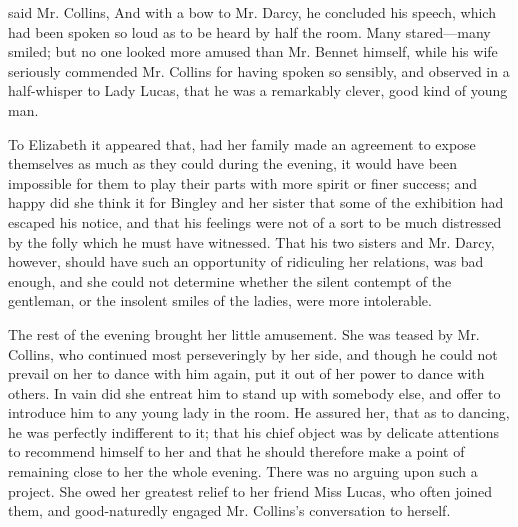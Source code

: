  said Mr. Collins,  And with a bow to Mr. Darcy, he concluded his speech, which had been spoken so loud as to be heard by half the room. Many stared---many smiled; but no one looked more amused than Mr. Bennet himself, while his wife seriously commended Mr. Collins for having spoken so sensibly, and observed in a half-whisper to Lady Lucas, that he was a remarkably clever, good kind of young man.

To Elizabeth it appeared that, had her family made an agreement to expose themselves as much as they could during the evening, it would have been impossible for them to play their parts with more spirit or finer success; and happy did she think it for Bingley and her sister that some of the exhibition had escaped his notice, and that his feelings were not of a sort to be much distressed by the folly which he must have witnessed. That his two sisters and Mr. Darcy, however, should have such an opportunity of ridiculing her relations, was bad enough, and she could not determine whether the silent contempt of the gentleman, or the insolent smiles of the ladies, were more intolerable.

The rest of the evening brought her little amusement. She was teased by Mr. Collins, who continued most perseveringly by her side, and though he could not prevail on her to dance with him again, put it out of her power to dance with others. In vain did she entreat him to stand up with somebody else, and offer to introduce him to any young lady in the room. He assured her, that as to dancing, he was perfectly indifferent to it; that his chief object was by delicate attentions to recommend himself to her and that he should therefore make a point of remaining close to her the whole evening. There was no arguing upon such a project. She owed her greatest relief to her friend Miss Lucas, who often joined them, and good-naturedly engaged Mr. Collins's conversation to herself.

